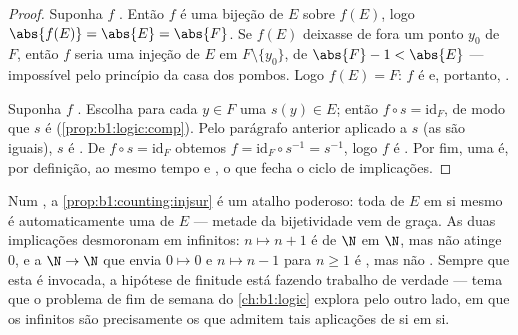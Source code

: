 \begin{proof}
Suponha $f$ . Então $f$ é uma bijeção de $E$ sobre $f(E)$,
logo $\abs{f(E)} = \abs{E} = \abs{F}$. Se $f(E)$ deixasse de fora um ponto $y_0$ de
$F$, então $f$ seria uma injeção de $E$ em $F \setminus \{y_0\}$,
 de  $\abs{F} - 1 < \abs{E}$ --- impossível pelo
princípio da casa dos pombos. Logo $f(E) = F$: $f$ é  e,
portanto, .

Suponha $f$ . Escolha para cada $y \in F$ uma  $s(y)
\in E$; então $f \circ s = \mathrm{id}_F$, de modo que $s$ é 
(\cref{prop:b1:logic:comp}). Pelo parágrafo anterior aplicado a $s$
(as  são iguais), $s$ é . De $f \circ s =
\mathrm{id}_F$ obtemos $f = \mathrm{id}_F \circ s^{-1} = s^{-1}$, logo
$f$ é . Por fim, uma   é, por definição, ao
mesmo tempo  e , o que fecha o ciclo de implicações.
\end{proof}

\begin{example}\label{ex:b1:counting:finiteonly}
Num  \emph{}, a \cref{prop:b1:counting:injsur} é um atalho
poderoso: toda   de $E$ em si mesmo é automaticamente
uma  de $E$ --- metade da bijetividade vem de graça. As duas
implicações desmoronam em  infinitos: $n \mapsto n + 1$ é
 de $\N$ em $\N$, mas não atinge $0$, e a  $\N \to \N$
que envia $0 \mapsto 0$ e $n \mapsto n - 1$ para $n \geq 1$ é
, mas não . Sempre que esta  é invocada,
a hipótese de finitude está fazendo trabalho de verdade --- tema que o
problema de fim de semana do \cref{ch:b1:logic} explora pelo outro lado, em
que os  infinitos são precisamente os que admitem tais
aplicações de si em si.
\end{example}

